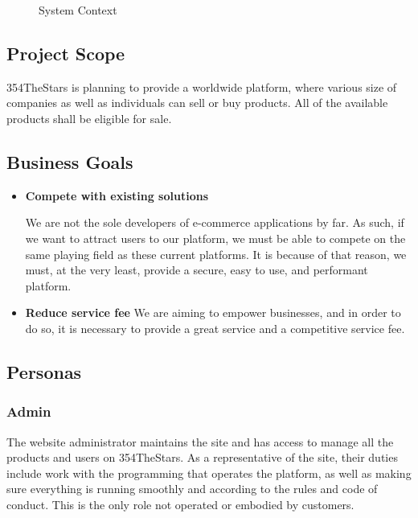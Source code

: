 \documentclass[11pt]{article}
\newcounter{use case ID}
\begin{document}
\clearpage

\begin{figure}[htbp]
    \caption{System Context}
    \label{fig:system-context}
\end{figure}

\subsection{Project Scope}
354TheStars is planning to provide a worldwide platform, where various size of companies as well as individuals can sell or buy products. All of the available products shall be eligible for sale.

\subsection{Business Goals}

\begin{itemize}
    \item \textbf{Compete with existing solutions}

        We are not the sole developers of e-commerce applications by far. As such, if we want to attract users to our platform, we must be able to compete on the same playing field as these current platforms. It is because of that reason, we must, at the very least, provide a secure, easy to use, and performant platform.

    \item \textbf{Reduce service fee}
        We are aiming to empower businesses, and in order to do so, it is necessary to provide a great service and a competitive service fee.

\end{itemize}

\subsection{Personas} \label{actors}
\subsubsection{Admin}
The website administrator maintains the site and has access to manage all the
products and users on 354TheStars. As a representative of the site, their duties include
work with the programming that operates the platform, as well as making sure
everything is running smoothly and according to the rules and code of conduct.
This is the only role not operated or embodied by customers.
\end{document}
